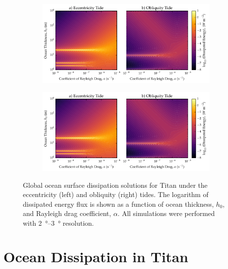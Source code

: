 \begin{figure}[!t]
    \centering
    \begin{subfigure}[t]{0.85\linewidth} %
        \includegraphics[width=\linewidth]{Figures/titan_linear}
        \label{fig:lincEccTitan}
    \end{subfigure}
    \begin{subfigure}[t]{0\linewidth} %
         \includegraphics[width=\linewidth]{Figures/titan_linear}
         \label{fig:linObliqTitan}   
    \end{subfigure}
    \vspace{-0.5cm}
\caption{Global ocean surface dissipation solutions for Titan under the eccentricity (left) and obliquity (right) tides. The logarithm of dissipated energy flux is shown as a function of ocean thickness, $h_0$, and Rayleigh drag coefficient, $\alpha$. All simulations were performed with \SIrange{2}{3}{\degree} resolution.}
\label{fig:linTitan}
\end{figure}

\section{Ocean Dissipation in Titan \label{sec:results_Titan}}

